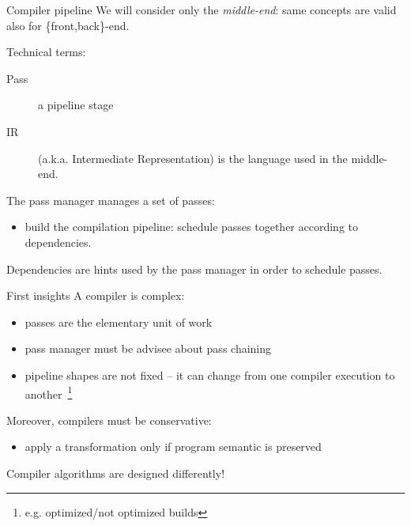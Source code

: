 \documentclass[10pt,mathserif]{beamer}
\begin{document}
\begin{frame}{Compiler pipeline}
We will consider only the \emph{middle-end}: same concepts are
valid also for \{front,back\}-end.

\vfill
Technical terms:
\begin{description}
\item[Pass] a pipeline stage
\item[IR] (a.k.a. Intermediate Representation) is the language used in the
          middle-end.
\end{description}

\vfill
The \alert{pass manager} manages a set of passes:
\begin{itemize}
\item build the compilation pipeline: \alert{schedule} passes together
      according to \alert{dependencies}.
\end{itemize}

\vfill
Dependencies are \alert{hints} used by the pass manager in order to schedule passes.
\end{frame}

\begin{frame}{First insights}
A compiler is \alert{complex}:

\begin{itemize}
\item passes are the \alert{elementary unit of work}
\item pass manager must be \alert{advisee} about pass chaining
\item pipeline shapes are \alert{not fixed} -- it can change from one compiler
      execution to another~\footnote{e.g. optimized/not optimized builds}
\end{itemize}

\vfill
Moreover, compilers must be \alert{conservative}:

\begin{itemize}
\item apply a transformation only if program \alert{semantic is preserved}
\end{itemize}

\vfill
Compiler algorithms are designed differently!
\end{frame}
\end{document}
